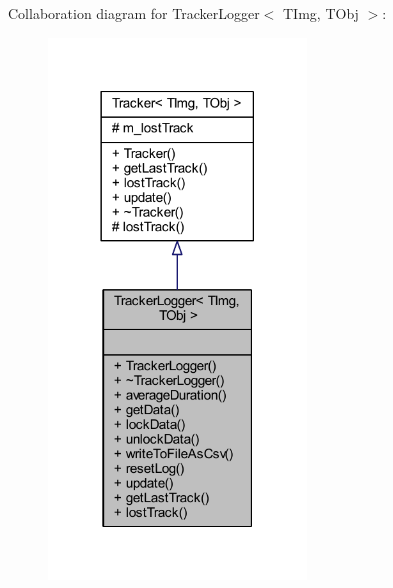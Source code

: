 Collaboration diagram for Tracker\+Logger$<$ T\+Img, T\+Obj $>$\+:
\nopagebreak
\begin{figure}[H]
\begin{center}
\leavevmode
\includegraphics[width=194pt]{class_vision_core_1_1_abstractions_1_1_tracker_logger__coll__graph}
\end{center}
\end{figure}
